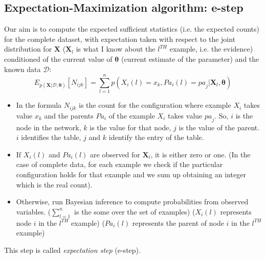 \subsection{Expectation-Maximization algorithm: e-step}
Our aim is to compute the expected sufficient statistics (i.e. the expected counts) for the complete dataset, with expectation taken with respect to the joint distribution for $\pmb{X}$ ($\pmb{X}_l$ is what I know about the $l^{\mathit{TH}}$ example, i.e. the evidence) conditioned of the current value of $\pmb{\theta}$ (current estimate of the parameter) and the known data $\mathcal{D}$:
\begin{equation}
    E_{p(\pmb{X}|\mathcal{D}, \pmb{\theta})}[N_{ijk}] = \sum_{l=1}^n p(X_i(l) = x_k, \mathit{Pa}_i(l) = \mathit{pa}_j | \pmb{X}_l, \pmb{\theta})
\end{equation}
\begin{itemize}
    \item In the formula $N_{ijk}$ is the count for the configuration where example $X_i$ takes value $x_k$ and the parents $\mathit{Pa}_i$ of the example $X_i$ takes value $\mathit{pa}_j$. So, $i$ is the node in the network, $k$ is the value for that node, $j$ is the value of the parent. $i$ identifies the table, $j$ and $k$ identify the entry of the table.
    
    \item If $X_i(l)$ and $\mathit{Pa}_i(l)$ are observed for $\pmb{X}_l$, it is either zero or one. (In the case of complete data, for each example we check if the particular configuration holds for that example and we sum up obtaining an integer which is the real count).
    
    \item Otherwise, run Bayesian inference to compute probabilities from observed variables. ($\sum_{l=1}^n$ is the some over the set of examples) ($X_i(l)$ represents node $i$ in the $l^{\mathit{TH}}$ example) ($\mathit{Pa}_i(l)$ represents the parent of node $i$ in the $l^{\mathit{TH}}$ example)
\end{itemize}

This step is called \textit{expectation step} (e-step).

